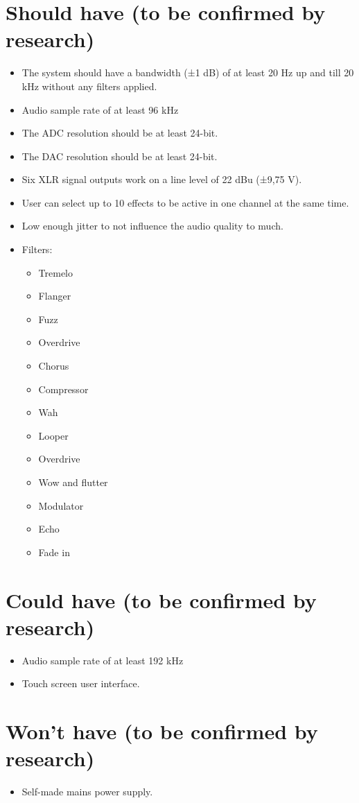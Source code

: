 	\section{Should have (to be confirmed by research)}
		\begin{itemize}
		\setlength\itemsep{-0.3em}
			\item The system should have a bandwidth (±1 dB) of at least 20 Hz up and till 20 kHz without any filters applied.
			\item Audio sample rate of at least 96 kHz
			\item The ADC resolution should be at least 24-bit.
			\item The DAC resolution should be at least 24-bit.
			\item Six XLR signal outputs work on a line level of 22 dBu (±9,75 V).
			\item User can select up to 10 effects to be active in one channel at the same time.
			\item Low enough jitter to not influence the audio quality to much.
			\item Filters:
			\begin{itemize}
			\setlength\itemsep{-0.3em}
				\item Tremelo
				\item Flanger
				\item Fuzz
				\item Overdrive
				\item Chorus
				\item Compressor
				\item Wah
				\item Looper
				\item Overdrive
				\item Wow and flutter
				\item Modulator 
				\item Echo
				\item Fade in
			\end{itemize}
		\end{itemize}
	
	\section{Could have (to be confirmed by research)}
		\begin{itemize}
		\setlength\itemsep{-0.3em}
			\item Audio sample rate of at least 192 kHz
			\item Touch screen user interface.
		\end{itemize}
	
	\section{Won't have (to be confirmed by research)}
		\begin{itemize}
		\setlength\itemsep{-0.3em}
			\item Self-made mains power supply.
		\end{itemize}
